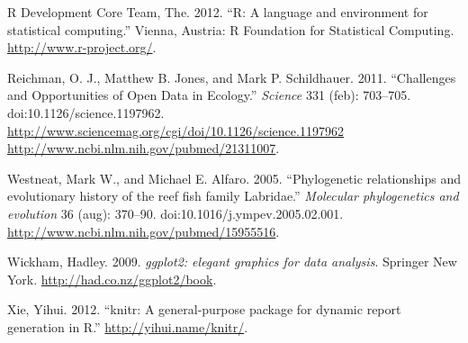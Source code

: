 \documentclass[author-year]{elsarticle} %
\begin{document}
R Development Core Team, The. 2012. ``R: A language and environment for
statistical computing.'' Vienna, Austria: R Foundation for Statistical
Computing. \href{http://www.r-project.org/}{http://www.r-project.org/}.

Reichman, O. J., Matthew B. Jones, and Mark P. Schildhauer. 2011.
``Challenges and Opportunities of Open Data in Ecology.'' \emph{Science}
331 (feb): 703--705. doi:10.1126/science.1197962.
\href{http://www.sciencemag.org/cgi/doi/10.1126/science.1197962 http://www.ncbi.nlm.nih.gov/pubmed/21311007}{http://www.sciencemag.org/cgi/doi/10.1126/science.1197962
http://www.ncbi.nlm.nih.gov/pubmed/21311007}.

Westneat, Mark W., and Michael E. Alfaro. 2005. ``Phylogenetic
relationships and evolutionary history of the reef fish family
Labridae.'' \emph{Molecular phylogenetics and evolution} 36 (aug):
370--90. doi:10.1016/j.ympev.2005.02.001.
\href{http://www.ncbi.nlm.nih.gov/pubmed/15955516}{http://www.ncbi.nlm.nih.gov/pubmed/15955516}.

Wickham, Hadley. 2009. \emph{ggplot2: elegant graphics for data
analysis}. Springer New York.
\href{http://had.co.nz/ggplot2/book}{http://had.co.nz/ggplot2/book}.

Xie, Yihui. 2012. ``knitr: A general-purpose package for dynamic report
generation in R.''
\href{http://yihui.name/knitr/}{http://yihui.name/knitr/}.



\end{document}
